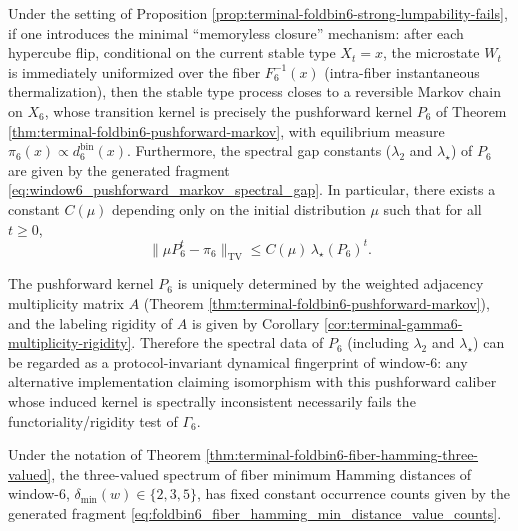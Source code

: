 \begin{corollary}\label{cor:terminal-foldbin6-minimal-markov-closure-gap}
Under the setting of Proposition \ref{prop:terminal-foldbin6-strong-lumpability-fails}, if one introduces the minimal ``memoryless closure'' mechanism: after each hypercube flip, conditional on the current stable type \(X_t=x\), the microstate \(W_t\) is immediately uniformized over the fiber \(F_6^{-1}(x)\) (intra-fiber instantaneous thermalization),
then the stable type process closes to a reversible Markov chain on \(X_6\), whose transition kernel is precisely the pushforward kernel \(P_6\) of Theorem \ref{thm:terminal-foldbin6-pushforward-markov}, with equilibrium measure \(\pi_6(x)\propto d^{\mathrm{bin}}_6(x)\).
Furthermore, the spectral gap constants (\(\lambda_2\) and \(\lambda_\star\)) of \(P_6\) are given by the generated fragment \eqref{eq:window6_pushforward_markov_spectral_gap}.
In particular, there exists a constant \(C(\mu)\) depending only on the initial distribution \(\mu\) such that for all \(t\ge 0\),
\[
\|\mu P_6^t-\pi_6\|_{\mathrm{TV}}\le C(\mu)\,\lambda_\star(P_6)^t.
\]
\end{corollary}


\begin{remark}\label{rem:terminal-p6-protocol-invariant-spectral-fingerprint}
The pushforward kernel \(P_6\) is uniquely determined by the weighted adjacency multiplicity matrix \(A\) (Theorem \ref{thm:terminal-foldbin6-pushforward-markov}), and the labeling rigidity of \(A\) is given by Corollary \ref{cor:terminal-gamma6-multiplicity-rigidity}.
Therefore the spectral data of \(P_6\) (including \(\lambda_2\) and \(\lambda_\star\)) can be regarded as a protocol-invariant dynamical fingerprint of window-\(6\): any alternative implementation claiming isomorphism with this pushforward caliber whose induced kernel is spectrally inconsistent necessarily fails the functoriality/rigidity test of \(\Gamma_6\).
\end{remark}

\begin{corollary}\label{cor:terminal-foldbin6-fiber-hamming-min-distance-histogram}
Under the notation of Theorem \ref{thm:terminal-foldbin6-fiber-hamming-three-valued}, the three-valued spectrum of fiber minimum Hamming distances of window-\(6\),
\(\delta_{\min}(w)\in\{2,3,5\}\), has fixed constant occurrence counts given by the generated fragment \eqref{eq:foldbin6_fiber_hamming_min_distance_value_counts}.
\end{corollary}


